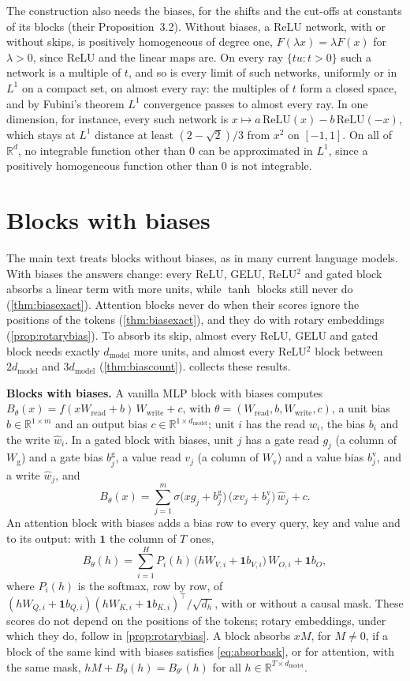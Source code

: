 \documentclass[10pt]{article}
\theoremstyle{definition}
\theoremstyle{remark}
\newcommand{\R}{\mathbb{R}}
\newcommand{\Wread}{W_{\mathrm{read}}}
\newcommand{\Wwrite}{W_{\mathrm{write}}}
\newcommand{\dm}{d_{\mathrm{model}}}
\newcommand{\para}[1]{\smallskip\noindent\textbf{#1}\hspace{0.5em}}
\begin{document}
The construction also needs the biases, for the shifts and the cut-offs at constants of its blocks (their Proposition~3.2). Without biases, a ReLU network, with or without skips, is positively homogeneous of degree one, $F(\lambda x) = \lambda F(x)$ for $\lambda > 0$, since ReLU and the linear maps are. On every ray $\{tu : t > 0\}$ such a network is a multiple of $t$, and so is every limit of such networks, uniformly or in $L^1$ on a compact set, on almost every ray: the multiples of $t$ form a closed space, and by Fubini's theorem $L^1$ convergence passes to almost every ray. In one dimension, for instance, every such network is $x \mapsto a\,\mathrm{ReLU}(x) - b\,\mathrm{ReLU}(-x)$, which stays at $L^1$ distance at least $(2 - \sqrt2)/3$ from $x^2$ on $[-1, 1]$. On all of $\R^d$, no integrable function other than $0$ can be approximated in $L^1$, since a positively homogeneous function other than $0$ is not integrable.


\section{Blocks with biases}\label{app:biases}

The main text treats blocks without biases, as in many current language models. With biases the answers change: every ReLU, GELU, ReLU$^2$ and gated block absorbs a linear term with more units, while $\tanh$ blocks still never do (\cref{thm:biasexact}). Attention blocks never do when their scores ignore the positions of the tokens (\cref{thm:biasexact}), and they do with rotary embeddings (\cref{prop:rotarybias}). To absorb its skip, almost every ReLU, GELU and gated block needs exactly $\dm$ more units, and almost every ReLU$^2$ block between $2\dm$ and $3\dm$ (\cref{thm:biascount}).  collects these results.

\para{Blocks with biases.} A vanilla MLP block with biases computes $B_\theta(x) = f(x\Wread + b)\,\Wwrite + c$, with $\theta = (\Wread, b, \Wwrite, c)$, a unit bias $b \in \R^{1\times m}$ and an output bias $c \in \R^{1\times\dm}$; unit $i$ has the read $w_i$, the bias $b_i$ and the write $\hat w_i$. In a gated block with biases, unit $j$ has a gate read $g_j$ (a column of $W_{\mathrm g}$) and a gate bias $b^{\mathrm g}_j$, a value read $v_j$ (a column of $W_{\mathrm v}$) and a value bias $b^{\mathrm v}_j$, and a write $\hat w_j$, and
\[
B_\theta(x) = \sum_{j=1}^{m} \sigma\big(xg_j + b^{\mathrm g}_j\big)\,\big(xv_j + b^{\mathrm v}_j\big)\,\hat w_j + c .
\]
An attention block with biases adds a bias row to every query, key and value and to its output: with $\mathbf 1$ the column of $T$ ones,
\[
B_\theta(h) = \sum_{i=1}^{H} P_i(h)\,\big(hW_{V,i} + \mathbf 1 b_{V,i}\big)\,W_{O,i} + \mathbf 1 b_O,
\]
where $P_i(h)$ is the softmax, row by row, of $(hW_{Q,i} + \mathbf 1 b_{Q,i})(hW_{K,i} + \mathbf 1 b_{K,i})^\top/\sqrt{d_h}$, with or without a causal mask. These scores do not depend on the positions of the tokens; rotary embeddings, under which they do, follow in \cref{prop:rotarybias}. A block absorbs $xM$, for $M \neq 0$, if a block of the same kind with biases satisfies \eqref{eq:absorbask}, or for attention, with the same mask, $hM + B_\theta(h) = B_{\theta'}(h)$ for all $h \in \R^{T\times\dm}$.
\end{document}
